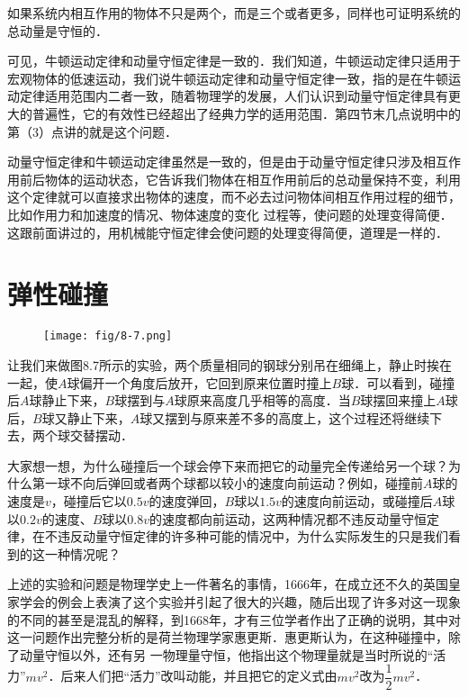 如果系统内相互作用的物体不只是两个，而是三个或者更多，同样也可证明系统的总动量是守恒的．

可见，牛顿运动定律和动量守恒定律是一致的．我们知道，牛顿运动定律只适用于宏观物体的低速运动，我们说牛顿运动定律和动量守恒定律一致，指的是在牛顿运动定律适用范围内二者一致，随着物理学的发展，人们认识到动量守恒定律具有更大的普遍性，它的有效性已经超出了经典力学的适用范围．第四节末几点说明中的第（3）点讲的就是这个问题．

动量守恒定律和牛顿运动定律虽然是一致的，但是由于动量守恒定律只涉及相互作用前后物体的运动状态，它告诉我们物体在相互作用前后的总动量保持不变，利用这个定律就可以直接求出物体的速度，而不必去过问物体间相互作用过程的细节，比如作用力和加速度的情况、物体速度的变化
过程等，使问题的处理变得简便．这跟前面讲过的，用机械能守恒定律会使问题的处理变得简便，道理是一样的．

\section{弹性碰撞}

\setcounter{figure}{6}
\begin{figure}[htp]\centering
\texttt{[image: fig/8-7.png]}
\caption{}
\end{figure}

让我们来做图8.7所示的实验，两个质量相同的钢球分别吊在细绳上，静止时挨在一起，使$A$球偏开一个角度后放开，它回到原来位置时撞上$B$球．可以看到，碰撞后$A$球静止下来，$B$球摆到与$A$球原来高度几乎相等的高度．当$B$球摆回来撞上$A$球后，$B$球又静止下来，$A$球又摆到与原来差不多的高度上，这个过程还将继续下去，两个球交替摆动．

大家想一想，为什么碰撞后一个球会停下来而把它的动量完全传递给另一个球？为什么第一球不向后弹回或者两个球都以较小的速度向前运动？例如，碰撞前$A$球的速度是$v$，碰撞后它以$0.5v$的速度弹回，$B$球以$1.5v$的速度向前运动，或碰撞后$A$球以$0.2v$的速度、$B$球以$0.8v$的速度都向前运动，这两种情况都不违反动量守恒定律，在不违反动量守恒定律的许多种可能的情况中，为什么实际发生的只是我们看到的这一种情况呢？

上述的实验和问题是物理学史上一件著名的事情，1666年，在成立还不久的英国皇家学会的例会上表演了这个实验并引起了很大的兴趣，随后出现了许多对这一现象的不同的甚至是混乱的解释，到1668年，才有三位学者作出了正确的说明，其中对这一问题作出完整分析的是荷兰物理学家惠更斯．惠更斯认为，在这种碰撞中，除了动量守恒以外，还有另
一物理量守恒，他指出这个物理量就是当时所说的“活力”$mv^2$．后来人们把“活力”改叫动能，并且把它的定义式由$mv^2$改为$\dfrac{1}{2}mv^2$．

